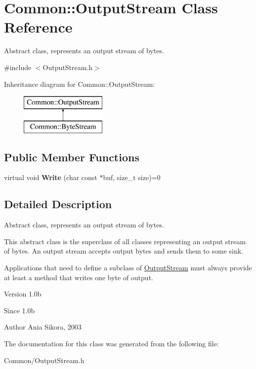 \hypertarget{class_common_1_1_output_stream}{\section{Common\-:\-:Output\-Stream Class Reference}
\label{class_common_1_1_output_stream}
}


Abstract class, represents an output stream of bytes.  




{\ttfamily \#include $<$Output\-Stream.\-h$>$}

Inheritance diagram for Common\-:\-:Output\-Stream\-:\begin{figure}[H]
\begin{center}
\leavevmode
\includegraphics[height=2.000000cm]{class_common_1_1_output_stream}
\end{center}
\end{figure}
\subsection*{Public Member Functions}
\begin{DoxyCompactItemize}
\item 
\hypertarget{class_common_1_1_output_stream_a165b55bad82bdff4f0e700827187ef88}{virtual void {\bfseries Write} (char const $\ast$buf, size\-\_\-t size)=0}\label{class_common_1_1_output_stream_a165b55bad82bdff4f0e700827187ef88}

\end{DoxyCompactItemize}


\subsection{Detailed Description}
Abstract class, represents an output stream of bytes. 

This abstract class is the superclass of all classes representing an output stream of bytes. An output stream accepts output bytes and sends them to some sink.

Applications that need to define a subclass of \hyperlink{class_common_1_1_output_stream}{Output\-Stream} must always provide at least a method that writes one byte of output.

\begin{DoxyVersion}{Version}
1.\-0b 
\end{DoxyVersion}
\begin{DoxySince}{Since}
1.\-0b 
\end{DoxySince}
\begin{DoxyAuthor}{Author}
Ania Sikora, 2003 
\end{DoxyAuthor}


The documentation for this class was generated from the following file\-:\begin{DoxyCompactItemize}
\item 
Common/Output\-Stream.\-h\end{DoxyCompactItemize}
